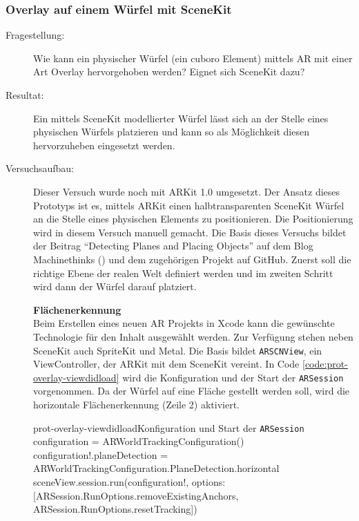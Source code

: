 \subsubsection{Overlay auf einem Würfel mit SceneKit}\label{subsub:prot-overlay}
\begin{description}
	\item[Fragestellung:] Wie kann ein physischer Würfel (ein cuboro Element) mittels AR mit einer Art Overlay hervorgehoben werden? Eignet sich SceneKit dazu?
	\item[Resultat:] Ein mittels SceneKit modellierter Würfel lässt sich an der Stelle eines physischen Würfels platzieren und kann so als Möglichkeit diesen hervorzuheben eingesetzt werden. %
	\item[Versuchsaufbau:] Dieser Versuch wurde noch mit ARKit 1.0 umgesetzt. Der Ansatz dieses Prototyps ist es, mittels ARKit einen halbtransparenten SceneKit Würfel an die Stelle eines physischen Elements zu positionieren. Die Positionierung wird in diesem Versuch manuell gemacht. Die Basis dieses Versuchs bildet der Beitrag "`Detecting Planes and Placing Objects"' auf dem Blog Machinethinks (\cite{arkit-dectingplanes-placingobjects}) und dem zugehörigen Projekt auf GitHub. Zuerst soll die richtige Ebene der realen Welt definiert werden und im zweiten Schritt wird dann der Würfel darauf platziert.

	\textbf{Flächenerkennung}\\
	Beim Erstellen eines neuen AR Projekts in Xcode kann die gewünschte Technologie für den Inhalt ausgewählt werden. Zur Verfügung stehen neben SceneKit auch SpriteKit und Metal. Die Basis bildet \texttt{ARSCNView}, ein ViewController, der ARKit mit dem SceneKit vereint. In Code \ref{code:prot-overlay-viewdidload} wird die Konfiguration und der Start der \texttt{ARSession} vorgenommen. Da der Würfel auf eine Fläche gestellt werden soll, wird die horizontale Flächenerkennung (Zeile 2) aktiviert.

	\begin{code}{prot-overlay-viewdidload}{Konfiguration und Start der \texttt{ARSession}}
		configuration = ARWorldTrackingConfiguration()
		configuration!.planeDetection = ARWorldTrackingConfiguration.PlaneDetection.horizontal
		sceneView.session.run(configuration!, options: [ARSession.RunOptions.removeExistingAnchors, ARSession.RunOptions.resetTracking])
	\end{code}


\end{description}
